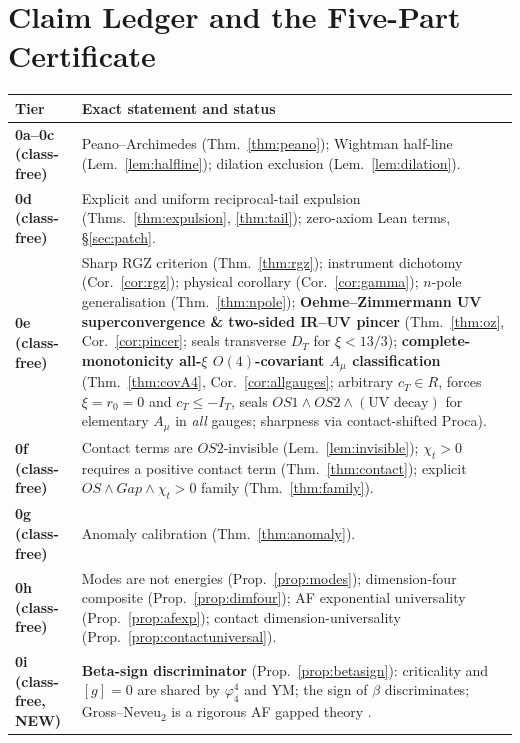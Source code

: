 \documentclass[11pt,a4paper]{article}
\def\R{R}\def\N{N}\def\Q{Q}\def\Z{Z}\def\Class{C}\def\OS{OS}\def\Gap{Gap}%
\theoremstyle{plain}
\theoremstyle{definition}
\theoremstyle{remark}
\newcommand{\R}{\mathbb{R}}\newcommand{\N}{\mathbb{N}}\newcommand{\Q}{\mathbb{Q}}
\newcommand{\Z}{\mathbb{Z}}\newcommand{\Spec}{\operatorname{Spec}}
\newcommand{\OS}{\mathrm{OS}}\newcommand{\Gap}{\mathrm{Gap}}
\newcommand{\Class}{\mathcal{C}}\newcommand{\Htot}{\mathcal{H}}
\newcommand{\Chit}{\chi_t}
\renewcommand{\_}{\oldunderscore\allowbreak}
\begin{document}
\section{Claim Ledger and the Five-Part Certificate}
\begin{table}[htbp]\centering\small
\renewcommand{\arraystretch}{1.24}
\begin{tabularx}{\textwidth}{>{\bfseries}p{3.3cm} X}
\toprule
Tier & Exact statement and status \\
\midrule
0a--0c (class-free) & Peano--Archimedes (Thm.~\ref{thm:peano}); Wightman half-line
(Lem.~\ref{lem:halfline}); dilation exclusion (Lem.~\ref{lem:dilation}). \\
\midrule
0d (class-free) & Explicit and uniform reciprocal-tail expulsion
(Thms.~\ref{thm:expulsion}, \ref{thm:tail}); zero-axiom Lean terms, \S\ref{sec:patch}. \\
\midrule
0e (class-free) & Sharp RGZ criterion (Thm.~\ref{thm:rgz}); instrument dichotomy
(Cor.~\ref{cor:rgz}); physical corollary (Cor.~\ref{cor:gamma}); $n$-pole generalisation
(Thm.~\ref{thm:npole}); \textbf{Oehme--Zimmermann UV superconvergence \& two-sided IR--UV pincer}
(Thm.~\ref{thm:oz}, Cor.~\ref{cor:pincer}; seals transverse $D_T$ for $\xi<13/3$); \textbf{complete-monotonicity all-$\xi$ $O(4)$-covariant $A_\mu$ classification} (Thm.~\ref{thm:covA4}, Cor.~\ref{cor:allgauges}; arbitrary $c_T\in\R$, forces $\xi=r_0=0$ and $c_T\le -I_T$, seals $\OS1\wedge\OS2\wedge(\text{UV decay})$ for elementary $A_\mu$ in \emph{all} gauges; sharpness via contact-shifted Proca). \\
\midrule
0f (class-free) & Contact terms are $\OS2$-invisible (Lem.~\ref{lem:invisible}); $\Chit>0$
requires a positive contact term (Thm.~\ref{thm:contact}); explicit
$\OS\wedge\Gap\wedge\Chit>0$ family (Thm.~\ref{thm:family}). \\
\midrule
0g (class-free) & Anomaly calibration (Thm.~\ref{thm:anomaly}). \\
\midrule
0h (class-free) & Modes are not energies (Prop.~\ref{prop:modes}); dimension-four composite
(Prop.~\ref{prop:dimfour}); AF exponential universality (Prop.~\ref{prop:afexp});
contact dimension-universality (Prop.~\ref{prop:contactuniversal}). \\
\midrule
\textbf{0i (class-free, NEW)} & \textbf{Beta-sign discriminator} (Prop.~\ref{prop:betasign}):
criticality and $[g]=0$ are shared by $\varphi^4_4$ and YM; the sign of $\beta$ discriminates;
Gross--Neveu$_2$ is a rigorous AF gapped theory \cite{FMRS1986,GK1985}. \\

\end{tabularx}
\end{table}
\end{document}
